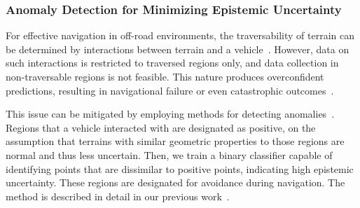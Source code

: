\subsubsection{Anomaly Detection for Minimizing Epistemic Uncertainty}\label{sec:uncertainty}

For effective navigation in off-road environments, the traversability of terrain can be determined by interactions between terrain and a vehicle~\cite{wellhausen2019should,Z_acoustic}. However, data on such interactions is restricted to traversed regions only, and data collection in non-traversable regions is not feasible. This nature produces overconfident predictions, resulting in navigational failure or even catastrophic outcomes~\cite{Wellhausen_2020}.

This issue can be mitigated by employing methods for detecting anomalies~\cite{kerner2019novelty,Wellhausen_2020,pmlr-v155-ji21a}. Regions that a vehicle interacted with are designated as positive, on the assumption that terrains with similar geometric properties to those regions are normal and thus less uncertain. Then, we train a binary classifier capable of identifying points that are dissimilar to positive points, indicating high epistemic uncertainty. These regions are designated for avoidance during navigation. The method is described in detail in our previous work~\cite{seo_scate_2023, seo2023learning}.


